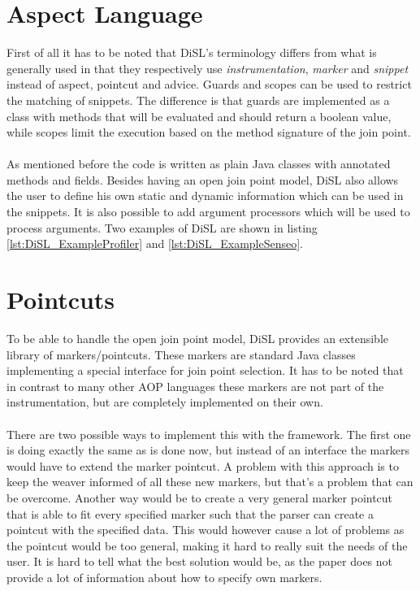 \documentclass[a4paper]{report}
\begin{document}
\section{Aspect Language}
First of all it has to be noted that DiSL's terminology differs from what is generally used in that they respectively use \textit{instrumentation}, \textit{marker} and \textit{snippet} instead of aspect, pointcut and advice. Guards and scopes can be used to restrict the matching of snippets. The difference is that guards are implemented as a class with methods that will be evaluated and should return a boolean value, while scopes limit the execution based on the method signature of the join point.\\
\\
As mentioned before the code is written as plain Java classes with annotated methods and fields. Besides having an open join point model, DiSL also allows the user to define his own static and dynamic information which can be used in the snippets. It is also possible to add argument processors which will be used to process arguments. Two examples of DiSL are shown in listing \ref{lst:DiSL_ExampleProfiler} and \ref{lst:DiSL_ExampleSenseo}.

\section{Pointcuts}
To be able to handle the open join point model, DiSL provides an extensible library of markers/pointcuts. These markers are standard Java classes implementing a special interface for join point selection. It has to be noted that in contrast to many other AOP languages these markers are not part of the instrumentation, but are completely implemented on their own.\\
\\
There are two possible ways to implement this with the framework. The first one is doing exactly the same as is done now, but instead of an interface the markers would have to extend the marker pointcut. A problem with this approach is to keep the weaver informed of all these new markers, but that's a problem that can be overcome. Another way would be to create a very general marker pointcut that is able to fit every specified marker such that the parser can create a pointcut with the specified data. This would however cause a lot of problems as the pointcut would be too general, making it hard to really suit the needs of the user. It is hard to tell what the best solution would be, as the paper does not provide a lot of information about how to specify own markers.
\end{document}
